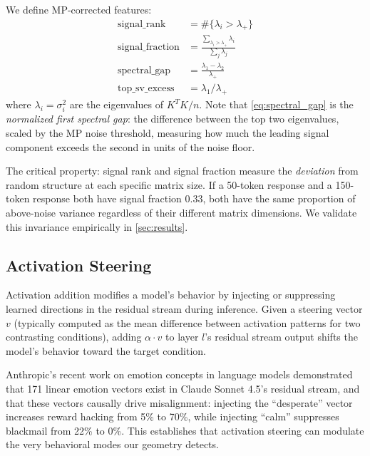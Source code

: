 We define MP-corrected features:
\begin{align}
  \text{signal\_rank} &= \#\{\lambda_i > \lambda_+\} \label{eq:signal_rank} \\
  \text{signal\_fraction} &= \frac{\sum_{\lambda_i > \lambda_+} \lambda_i}{\sum_j \lambda_j} \label{eq:signal_frac} \\
  \text{spectral\_gap} &= \frac{\lambda_1 - \lambda_2}{\lambda_+} \label{eq:spectral_gap} \\
  \text{top\_sv\_excess} &= \lambda_1 / \lambda_+ \label{eq:sv_excess}
\end{align}
where $\lambda_i = \sigma_i^2$ are the eigenvalues of $K^T K / n$.
Note that \cref{eq:spectral_gap} is the \emph{normalized first spectral
gap}: the difference between the top two eigenvalues, scaled by the MP
noise threshold, measuring how much the leading signal component exceeds
the second in units of the noise floor.

The critical property: signal rank and signal fraction measure the
\emph{deviation} from random structure at each specific matrix size.
If a 50-token response and a 150-token response both have signal fraction
0.33, both have the same proportion of above-noise variance regardless
of their different matrix dimensions. We validate this invariance
empirically in \cref{sec:results}.

\subsection{Activation Steering}

Activation addition \citep{panickssery2023caa} modifies a model's
behavior by injecting or suppressing learned directions in the residual
stream during inference. Given a steering vector $v$ (typically computed
as the mean difference between activation patterns for two contrasting
conditions), adding $\alpha \cdot v$ to layer $l$'s residual stream output
shifts the model's behavior toward the target condition.

Anthropic's recent work on emotion concepts in language models
\citep{anthropic2026emotions} demonstrated that 171 linear emotion vectors
exist in Claude Sonnet 4.5's residual stream, and that these vectors
causally drive misalignment: injecting the ``desperate'' vector increases
reward hacking from 5\% to 70\%, while injecting ``calm'' suppresses
blackmail from 22\% to 0\%. This establishes that activation steering can
modulate the very behavioral modes our geometry detects.

